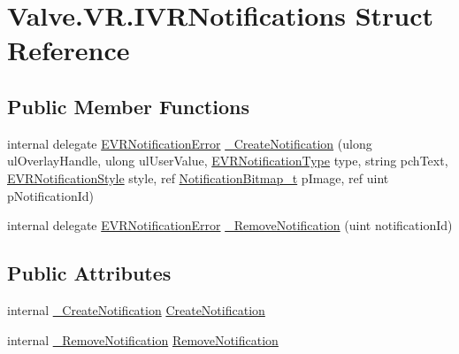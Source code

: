 \hypertarget{struct_valve_1_1_v_r_1_1_i_v_r_notifications}{}\section{Valve.\+V\+R.\+I\+V\+R\+Notifications Struct Reference}
\label{struct_valve_1_1_v_r_1_1_i_v_r_notifications}
\subsection*{Public Member Functions}
\begin{DoxyCompactItemize}
\item 
internal delegate \mbox{\hyperlink{namespace_valve_1_1_v_r_a9cf788def226e718d9ea88fd55c55646}{E\+V\+R\+Notification\+Error}} \mbox{\hyperlink{struct_valve_1_1_v_r_1_1_i_v_r_notifications_a2e0dd80f177dcb6d1abe8bd96f907867}{\+\_\+\+Create\+Notification}} (ulong ul\+Overlay\+Handle, ulong ul\+User\+Value, \mbox{\hyperlink{namespace_valve_1_1_v_r_a8401e5b24b0e324a8dd57fe55b00fc65}{E\+V\+R\+Notification\+Type}} type, string pch\+Text, \mbox{\hyperlink{namespace_valve_1_1_v_r_a63b67bb250f81d54e3d3839945bb29da}{E\+V\+R\+Notification\+Style}} style, ref \mbox{\hyperlink{struct_valve_1_1_v_r_1_1_notification_bitmap__t}{Notification\+Bitmap\+\_\+t}} p\+Image, ref uint p\+Notification\+Id)
\item 
internal delegate \mbox{\hyperlink{namespace_valve_1_1_v_r_a9cf788def226e718d9ea88fd55c55646}{E\+V\+R\+Notification\+Error}} \mbox{\hyperlink{struct_valve_1_1_v_r_1_1_i_v_r_notifications_a2778d2957ddd654d347f34e2659da671}{\+\_\+\+Remove\+Notification}} (uint notification\+Id)
\end{DoxyCompactItemize}
\subsection*{Public Attributes}
\begin{DoxyCompactItemize}
\item 
internal \mbox{\hyperlink{struct_valve_1_1_v_r_1_1_i_v_r_notifications_a2e0dd80f177dcb6d1abe8bd96f907867}{\+\_\+\+Create\+Notification}} \mbox{\hyperlink{struct_valve_1_1_v_r_1_1_i_v_r_notifications_a1d2d398c1586a0543ad970f777e0427a}{Create\+Notification}}
\item 
internal \mbox{\hyperlink{struct_valve_1_1_v_r_1_1_i_v_r_notifications_a2778d2957ddd654d347f34e2659da671}{\+\_\+\+Remove\+Notification}} \mbox{\hyperlink{struct_valve_1_1_v_r_1_1_i_v_r_notifications_abba0fee2e78b73b243af83745cbf0e9a}{Remove\+Notification}}
\end{DoxyCompactItemize}


